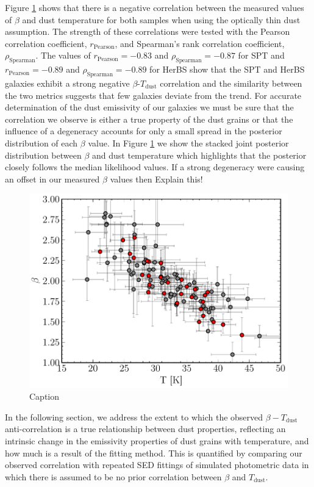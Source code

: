 Figure \ref{fig:beta_t_correlation} shows that there is a negative correlation between the measured values of $\beta$ and dust temperature for both samples when using the optically thin dust assumption. The strength of these correlations were tested with the Pearson correlation coefficient, $r_{\textrm{Pearson}}$, and Spearman's rank correlation coefficient, $\rho_{\textrm{Spearman}}$. The values of $r_{\textrm{Pearson}} = -0.83$ and $\rho_{\textrm{Spearman}} = -0.87$ for SPT and $r_{\textrm{Pearson}} = -0.89$ and $\rho_{\textrm{Spearman}} = -0.89$ for HerBS show that the SPT and HerBS galaxies exhibit a strong negative $\beta$-$T_{\textrm{dust}}$ correlation and the similarity between the two metrics suggests that few galaxies deviate from the trend. For accurate determination of the dust emissivity of our galaxies we must be sure that the correlation we observe is either a true property of the dust grains or that the influence of a degeneracy accounts for only a small spread in the posterior distribution of each $\beta$ value. In Figure \ref{fig:beta_t_correlation} we show the stacked joint posterior distribution between $\beta$ and dust temperature which highlights that the posterior closely follows the median likelihood values. If a strong degeneracy were causing an offset in our measured $\beta$ values then {\color{red} Explain this!}

\begin{figure}
	\centering
	\includegraphics[width=0.75\columnwidth]{Figures/beta_t_correlation.pdf}
	\caption{Caption}
	\label{fig:beta_t_correlation}
\end{figure}

In the following section, we address the extent to which the observed $\beta-T_{\textrm{dust}}$ anti-correlation is a true relationship between dust properties, reflecting an intrinsic change in the emissivity properties of dust grains with temperature, and how much is a result of the fitting method. This is quantified by comparing our observed correlation with repeated SED fittings of simulated photometric data in which there is assumed to be no prior correlation between $\beta$ and $T_{\textrm{dust}}$.

